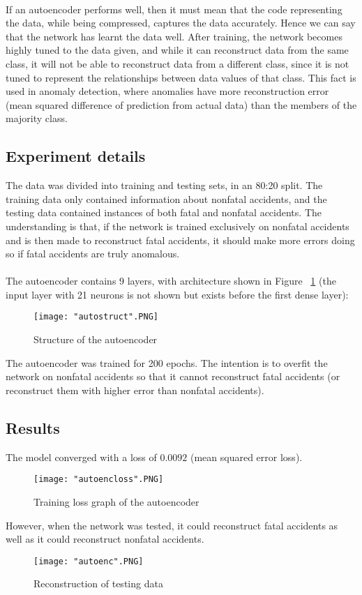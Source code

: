 \documentclass[a4paper, 12pt]{article}
\begin{document}
\paragraph{} If an autoencoder performs well, then it must mean that the code representing the data, while being compressed, captures the data accurately. Hence we can say that the network has learnt the data well. After training, the network becomes highly tuned to the data given, and while it can reconstruct data from the same class, it will not be able to reconstruct data from a different class, since it is not tuned to represent the relationships between data values of that class. This fact is used in anomaly detection, where anomalies have more reconstruction error (mean squared difference of prediction from actual data) than the members of the majority class.
\subsection{Experiment details} The data was divided into training and testing sets, in an 80:20 split. The training data only contained information about nonfatal accidents, and the testing data contained instances of both fatal and nonfatal accidents. The understanding is that, if the network is trained exclusively on nonfatal accidents and is then made to reconstruct fatal accidents, it should make more errors doing so if fatal accidents are truly anomalous.
\paragraph{} The autoencoder contains 9 layers, with architecture shown in Figure ~\ref{fig:autoarch} (the input layer with 21 neurons is not shown but exists before the first dense layer): 
\begin{figure}[h]
\centering
\texttt{[image: "autostruct".PNG]}
\caption{Structure of the autoencoder}
\label{fig:autoarch}
\end{figure}
The autoencoder was trained for 200 epochs. The intention is to overfit the network on nonfatal accidents so that it cannot reconstruct fatal accidents (or reconstruct them with higher error than nonfatal accidents).
\subsection{Results} 
The model converged with a loss of $0.0092$ (mean squared error loss).
\begin{figure}[h]
\centering
\texttt{[image: "autoencloss".PNG]}
\caption{Training loss graph of the autoencoder}
\end{figure}
However, when the network was tested, it could reconstruct fatal accidents as well as it could reconstruct nonfatal accidents.
\begin{figure}[!h]
\centering
\texttt{[image: "autoenc".PNG]}
\caption{Reconstruction of testing data}
\end{figure}
\end{document}
